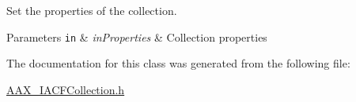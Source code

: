 Set the properties of the collection. 


\begin{DoxyParams}[1]{Parameters}
\mbox{\tt in}  & {\em in\+Properties} & Collection properties \\
\hline
\end{DoxyParams}


The documentation for this class was generated from the following file\+:\begin{DoxyCompactItemize}
\item 
\hyperlink{a00217}{A\+A\+X\+\_\+\+I\+A\+C\+F\+Collection.\+h}\end{DoxyCompactItemize}
